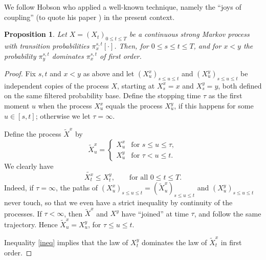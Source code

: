 \documentclass[11pt,a4paper]{article}%
\newtheorem{proposition}[theorem]{Proposition}
\numberwithin{equation}{section}
\begin{document}
We follow Hobson who applied a well-known technique, namely the ``joys of coupling'' (to quote his paper \cite{Ho98c}) in the present context.

\begin{proposition}\label{Hobson}
Let $X = (X_t)_{0 \le t \le T}$ be a continuous strong Markov process with transition probabilities $ \pi_x^{s,t}[ \cdot]$. Then, for $0 \le s \le t \le T$, and for $x < y$ the probability $\pi_y^{s,t}$ dominates  $\pi_x^{s,t}$ of first order.
\end{proposition}

\begin{proof}
Fix $s, t$ and $ x<y $ as above and let $(X^x_u)_{s \le u \le t}$ and $(X^y_u)_{s \le u \le t}$ be independent copies of the process $X$, starting at $X^x_s=x$ and $X^y_s = y$, both defined on the same filtered probability base. Define the stopping time $\tau$ as the first moment $u$ when the process $X^x_u$ equals the process $X^y_u$, if this happens for some $u \in [s,t]$; otherwise we let $\tau = \infty$.

Define the process $\tilde{X}^x$ by
\[
	\tilde{X}^x_u = 
	\begin{cases} 
		X_u^x & \text{for }s \leq u \leq \tau, \\
		X_u^y & \text{for }\tau < u \leq t.
	\end{cases}	
\]
We clearly have 
\begin{equation}\label{ineq}
\tilde{X^x_t} \le X^y_t,\qquad \text{for all } 0 \le t \le T.
\end{equation}
Indeed, if $\tau = \infty$, the paths of $(X^x_u)_{s \le u \le t} = (\tilde{X}_u^x)_{s \le u \le t}$ and $(X^y_u)_{s \le u \le t}$ never touch, so that we even have a strict inequality by continuity of the processes. If $\tau < \infty$, then $\tilde{X}^x$ and ${X^y}$ have ``joined'' at time $\tau$, and follow the same trajectory. Hence $\tilde{X}_u^x = X^y_u$, for $\tau \le u \le t$.

Inequality \ref{ineq} implies that the law of $X^y_t$ dominates the law of $\tilde{X}_t^x$ in first order.
\end{proof}
\end{document}
